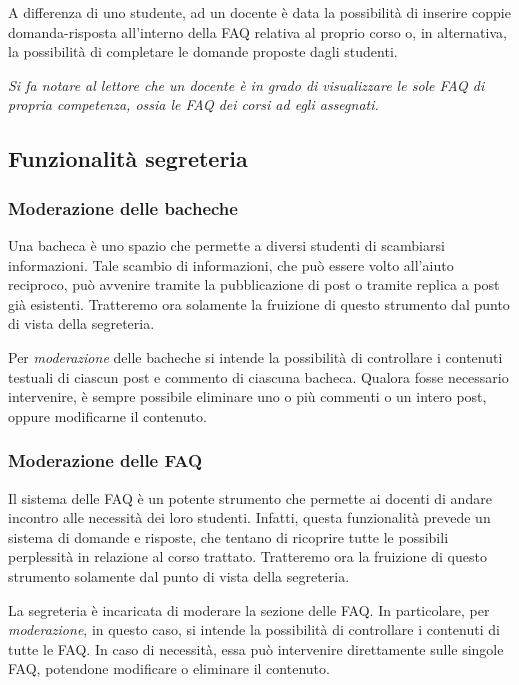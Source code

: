 \documentclass [a4paper,11pt]{book}
\begin{document}
A differenza di uno studente, ad un docente è data la possibilità di inserire coppie domanda-risposta all'interno della FAQ relativa al proprio corso o, in alternativa, la possibilità di completare le domande proposte dagli studenti.

\emph{Si fa notare al lettore che un docente è in grado di visualizzare le sole FAQ di propria competenza, ossia le FAQ dei corsi ad egli assegnati.}
\medskip

\subsection{Funzionalità segreteria}

\subsubsection{Moderazione delle bacheche}

Una bacheca è uno spazio che permette a diversi studenti di scambiarsi informazioni. Tale scambio di informazioni, che può essere volto all'aiuto reciproco, può avvenire tramite la pubblicazione di post o tramite replica a post già esistenti. Tratteremo ora solamente la fruizione di questo strumento dal punto di vista della segreteria.

Per \emph{moderazione} delle bacheche si intende la possibilità di controllare i contenuti testuali di ciascun post e commento di ciascuna bacheca. Qualora fosse necessario intervenire, è sempre possibile eliminare uno o più commenti o un intero post, oppure modificarne il contenuto.

\medskip

\subsubsection{Moderazione delle FAQ}

Il sistema delle FAQ è un potente strumento che permette ai docenti di andare incontro alle necessità dei loro studenti. Infatti, questa funzionalità prevede un sistema di domande e risposte, che tentano di ricoprire tutte le possibili perplessità in relazione al corso trattato. Tratteremo ora la fruizione di questo strumento solamente dal punto di vista della segreteria.

La segreteria è incaricata di moderare la sezione delle FAQ. In particolare, per \emph{moderazione}, in questo caso, si intende la possibilità di controllare i contenuti di tutte le FAQ. In caso di necessità, essa può intervenire direttamente sulle singole FAQ, potendone modificare o eliminare il contenuto. 
\end{document}
